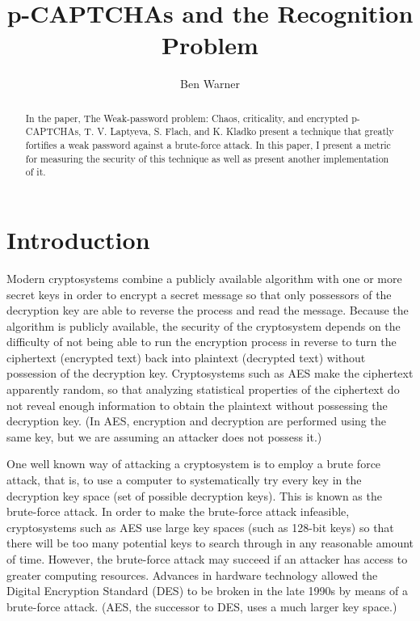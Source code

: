 \documentclass[12pt]{article}
\begin{document}
\title{p-CAPTCHAs and the Recognition Problem}
\author{Ben Warner}
\maketitle

\begin{abstract}
In the paper, The Weak-password problem: Chaos, criticality, and encrypted p-CAPTCHAs, T. V. Laptyeva, S. Flach, and K. Kladko present a technique that greatly fortifies a weak password against a brute-force attack. In this paper, I present a metric for measuring the security of this technique as well as present another implementation of it.
\end{abstract}

\section*{Introduction}
	Modern cryptosystems combine a publicly available algorithm with one or more secret keys in order to encrypt a secret message so that only possessors of the decryption key are able to reverse the process and read the message. Because the algorithm is publicly available, the security of the cryptosystem depends on the difficulty of not being able to run the encryption process in reverse to turn the ciphertext (encrypted text) back into plaintext (decrypted text) without possession of the decryption key. Cryptosystems such as AES make the ciphertext apparently random, so that analyzing statistical properties of the ciphertext do not reveal enough information to obtain the plaintext without possessing the decryption key. (In AES, encryption and decryption are performed using the same key, but we are assuming an attacker does not possess it.)

	One well known way of attacking a cryptosystem is to employ a brute force attack, that is, to use a computer to systematically try every key in the decryption key space (set of possible decryption keys). This is known as the brute-force attack. In order to make the brute-force attack infeasible, cryptosystems such as AES use large key spaces (such as 128-bit keys) so that there will be too many potential keys to search through in any reasonable amount of time. However, the brute-force attack may succeed if an attacker has access to greater computing resources. Advances in hardware technology allowed the Digital Encryption Standard (DES) to be broken in the late 1990s by means of a brute-force attack. (AES, the successor to DES, uses a much larger key space.)
\end{document}
